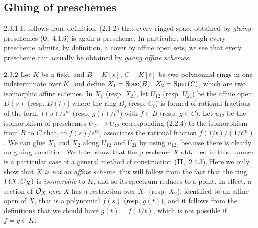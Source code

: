 \documentclass[../main.tex]{subfiles}
\begin{document}
\subsection{Gluing of preschemes}

\begin{cx}{2.3.1}
    It follows from definition~(2.1.2) that every ringed space obtained by \emph{gluing} preschemes (\textbf{0},~4.1.6) is again a prescheme.
    In particular, although every prescheme admits, by definition, a cover by affine open sets, we see that every prescheme can actually be obtained by \emph{gluing affine schemes}.
\end{cx}

\begin{cx}[Example]{2.3.2}
    Let $K$ be a field, and $B=K[s]$, $C=K[t]$ be two polynomial rings in one indeterminate over $K$, and define $X_1=\operatorname*{Spec}(B)$, $X_2=\operatorname*{Spec}(C)$, which are two isomorphic affine schemes.
    In $X_1$ (resp. $X_2$), let $U_{12}$ (resp. $U_{21}$) be the affine open $D(s)$ (resp. $D(t)$) where the ring $B_s$ (resp. $C_t$) is formed of rational fractions of the form $f(s)/s^m$ (resp. $g(t)/t^n$) with $f\in B$ (resp. $g\in C$).
    Let $u_{12}$ be the isomorphism of preschemes $U_{21}\to U_{12}$ corresponding (2.2.4) to the isomorphism from $B$ to $C$ that, to $f(s)/s^m$, associates the rational fraction $f(1/t)/(1/t^m)$.
    We can glue $X_1$ and $X_2$ along $U_{12}$ and $U_{21}$ by using $u_{12}$, because there is clearly no gluing condition.
    We later show that the prescheme $X$ obtained in this manner is a particular case of a general method of construction (\textbf{II},~2.4.3).
    Here we only show that $X$ \emph{is not an affine scheme}; this will follow from the fact that the ring $\Gamma(X,\mathcal{O}_X)$ is \emph{isomorphic} to $K$, and so its spectrum reduces to a point.
    In effect, a section of $\mathcal{O}_X$ over $X$ has a restriction over $X_1$ (resp. $X_2$), identified to an affine open of $X$, that is a polynomial $f(s)$ (resp. $g(t)$), and it follows from the definitions that we should have $g(t)=f(1/t)$, which is not possible if $f=g\in K$.
\end{cx}
\end{document}
